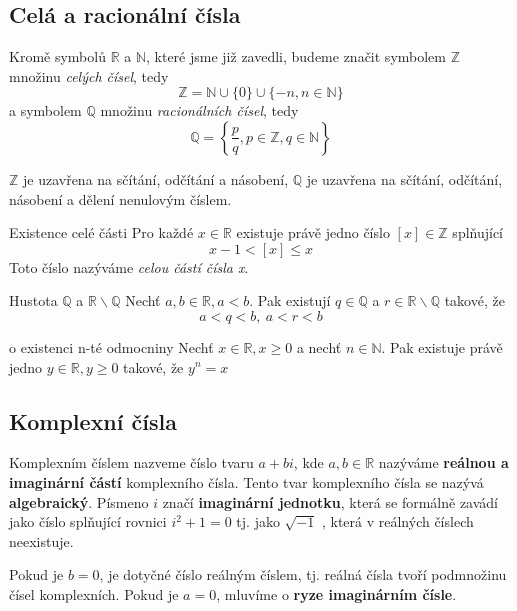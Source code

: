 \subsection{Celá a racionální čísla}
\begin{definice}
	Kromě symbolů $\mathbb{R}$ a $\mathbb{N}$, které jsme již zavedli, budeme značit symbolem $\mathbb{Z}$ množinu \emph{celých čísel}, tedy
	$$\mathbb{Z} = \mathbb{N} \cup \{0\} \cup \{-n, n \in \mathbb{N}\}$$
	a symbolem $\mathbb{Q}$ množinu \emph{racionálních čísel}, tedy
	$$\mathbb{Q} = \left\{ \frac{p}{q}, p \in \mathbb{Z}, q \in \mathbb{N} \right\}$$
	
	$\mathbb{Z}$ je uzavřena na sčítání, odčítání a násobení,
	$\mathbb{Q}$ je uzavřena na sčítání, odčítání, násobení a dělení nenulovým číslem.
	
\end{definice}

\begin{vetaN}{Existence celé části}
	Pro každé $x \in \mathbb{R}$ existuje právě jedno číslo $[x] \in \mathbb{Z}$ splňující
	$$x-1 < [x] \le x$$
	Toto číslo nazýváme \emph{celou částí čísla x}.
\end{vetaN}

\begin{vetaN}{Hustota $\mathbb{Q}$ a $\mathbb{R} \backslash \mathbb{Q}$}
	Nechť $a,b \in \mathbb{R}, a < b$. Pak existují $q \in \mathbb{Q}$ a $r \in \mathbb{R} \backslash \mathbb{Q}$ takové, že
	$$a < q < b,\ a < r < b$$
\end{vetaN}

\begin{vetaN}{o existenci n-té odmocniny}
	Nechť $x \in \mathbb{R}, x \ge 0$ a nechť $n \in \mathbb{N}$. Pak existuje právě jedno $y \in \mathbb{R}, y \ge 0$ takové, že $y^n = x$
\end{vetaN}

\subsection{Komplexní čísla}
\begin{definice}
Komplexním číslem nazveme číslo tvaru $a + bi$, kde $a,b \in \mathbb{R}$ nazýváme \textbf{reálnou a imaginární částí} komplexního čísla. Tento tvar komplexního čísla se nazývá \textbf{algebraický}. Písmeno $i$ značí \textbf{imaginární jednotku}, která se formálně zavádí jako číslo splňující rovnici $i^2 +1 = 0$ tj. jako $\sqrt{-1}$ , která v reálných číslech neexistuje.

Pokud je $b = 0$, je dotyčné číslo reálným číslem, tj. reálná čísla tvoří podmnožinu čísel komplexních. Pokud je $a = 0$, mluvíme o \textbf{ryze imaginárním čísle}.
\end{definice}

